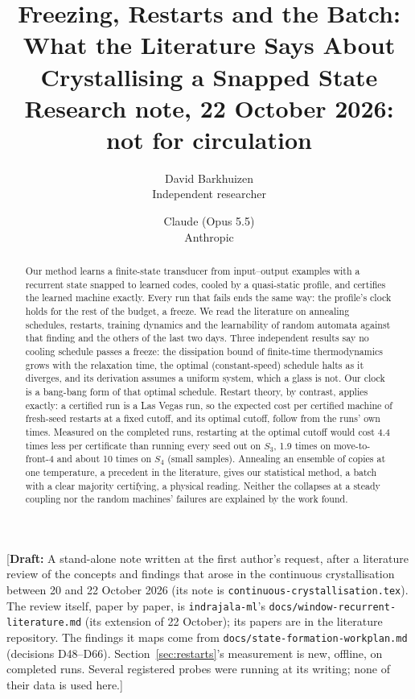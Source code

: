 \documentclass[11pt]{article}
\title{Freezing, Restarts and the Batch:\\What the Literature Says About Crystallising a Snapped State\\[0.5em]
\large Research note, 22 October 2026: not for circulation}
\author{
  David Barkhuizen\\
  Independent researcher
  \and
  Claude (Opus 5.5)\\
  Anthropic
}
\date{}
\newcommand{\draftnote}[1]{\textcolor{red!70!black}{[\textbf{Draft:} #1]}}
\begin{document}
\maketitle

\draftnote{A stand-alone note written at the first author's request, after a literature review of the
concepts and findings that arose in the continuous crystallisation between 20 and 22 October 2026
(its note is \texttt{continuous-crystallisation.tex}). The review itself, paper by paper, is \texttt{indrajala-ml}'s
\texttt{docs/\allowbreak window-recurrent-\allowbreak literature.md} (its extension of 22 October); its papers are in the
literature repository. The findings it maps come from \texttt{docs/\allowbreak state-formation-\allowbreak workplan.md}
(decisions D48--D66). Section~\ref{sec:restarts}'s measurement is new, offline, on completed runs.
Several registered probes were running at its writing; none of their data is used here.}

\begin{abstract}
Our method learns a finite-state transducer from input--output examples with a recurrent state
snapped to learned codes, cooled by a quasi-static profile, and certifies the learned machine
exactly. Every run that fails ends the same way: the profile's clock holds for the rest of the
budget, a freeze. We read the literature on annealing schedules, restarts, training dynamics and the
learnability of random automata against that finding and the others of the last two days. Three
independent results say no cooling schedule passes a freeze: the dissipation bound of finite-time
thermodynamics grows with the relaxation time, the optimal (constant-speed) schedule halts as it
diverges, and its derivation assumes a uniform system, which a glass is not. Our clock is a
bang-bang form of that optimal schedule. Restart theory, by contrast, applies exactly: a certified
run is a Las Vegas run, so the expected cost per certified machine of fresh-seed restarts at a fixed
cutoff, and its optimal cutoff, follow from the runs' own times. Measured on the completed runs,
restarting at the optimal cutoff would cost 4.4 times less per certificate than running every seed out
on $S_3$, 1.9 times on move-to-front-4 and about 10 times on $S_4$ (small samples). Annealing an
ensemble of copies at one temperature, a precedent in the literature, gives our statistical method,
a batch with a clear majority certifying, a physical reading. Neither the collapses at a steady
coupling nor the random machines' failures are explained by the work found.
\end{abstract}
\end{document}
